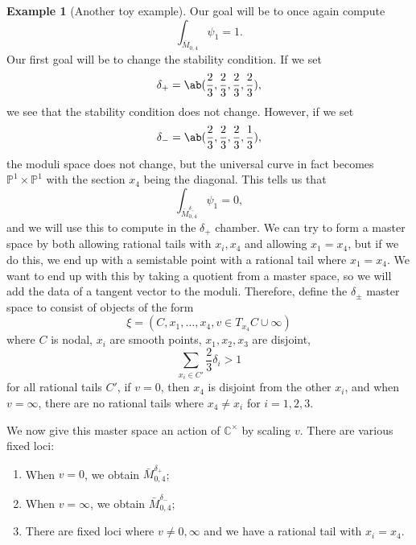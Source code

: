 \documentclass{amsart}
\theoremstyle{definition}
\newtheorem{exm}[thm]{Example}
\theoremstyle{remark}
\theoremstyle{plain}
\theoremstyle{definition}
\theoremstyle{remark}
\newcommand{\C}{\mathbb{C}}
\renewcommand{\P}{\mathbb{P}}
\newcommand{\1}{\mathbf{1}}
\newcommand{\2}{\mathbf{2}}
\newcommand{\3}{\mathbf{3}}
\begin{document}
\begin{exm}[Another toy example]
    Our goal will be to once again compute
    \[ \int_{\bar{M}_{0,4}} \psi_1 = 1. \]
    Our first goal will be to change the stability condition. If we set
    \[ \delta_+ = \ab(\frac{2}{3}, \frac{2}{3}, \frac{2}{3}, \frac{2}{3}), \]
    we see that the stability condition does not change. However, if we set
    \[ \delta_- = \ab(\frac{2}{3}, \frac{2}{3}, \frac{2}{3}, \frac{1}{3}), \]
    the moduli space does not change, but the universal curve in fact becomes \(\P^1 \times \P^1\) with the section \(x_4\) being the diagonal. This tells us that
    \[ \int_{\bar{M}_{0,4}^{\delta_-}} \psi_1 = 0, \]
    and we will use this to compute in the \(\delta_+\) chamber. We can try to form a master space by both allowing rational tails with \(x_i, x_4\) and allowing \(x_1 = x_4\), but if we do this, we end up with a semistable point with a rational tail where \(x_1 = x_4\). We want to end up with this by taking a quotient from a master space, so we will add the data of a tangent vector to the moduli. Therefore, define the \(\delta_{\pm}\) master space to consist of objects of the form
    \[ \xi = (C, x_1, \ldots, x_4, v \in T_{x_4} C \cup \infty) \]
    where \(C\) is nodal, \(x_i\) are smooth points, \(x_1, x_2, x_3\) are disjoint,
    \[ \sum_{x_i \in C'} \frac{2}{3} \delta_i > 1 \]
    for all rational tails \(C'\), if \(v = 0\), then \(x_4\) is disjoint from the other \(x_i\), and when \(v = \infty\), there are no rational tails where \(x_4 \neq x_i\) for \(i = 1,2,3\). 

    We now give this master space an action of \(\C^{\times}\) by scaling \(v\). There are various fixed loci:
    \begin{enumerate}
        \item When \(v = 0\), we obtain \(\bar{M}_{0,4}^{\delta_+}\);
        \item When \(v = \infty\), we obtain \(\bar{M}_{0,4}^{\delta_-}\);
        \item There are fixed loci where \(v \neq 0,\infty\) and we have a rational tail with \(x_i = x_4\).
    \end{enumerate}


\end{exm}
\end{document}
